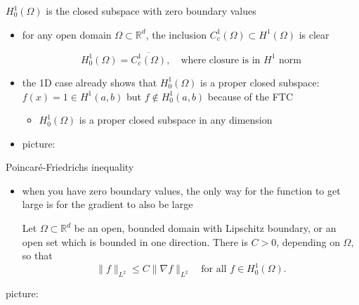 \documentclass[10pt,
               svgnames,
               hyperref={colorlinks,
                         citecolor=DeepPink4,
                         linkcolor=FireBrick,
                         urlcolor=blue},
               usepdftitle=false]{beamer}
\newcommand{\RR}{\mathbb{R}}
\newcommand{\grad}{\nabla}
\begin{document}
\begin{frame}{$H_0^1(\Omega)$ is the closed subspace with zero boundary values}

\begin{itemize}
\item for any open domain $\Omega \subset \RR^d$, the inclusion $C_c^1(\Omega) \subset H^1(\Omega)$ is clear

\begin{definition}
    $$H_0^1(\Omega) = \overline{C_c^1(\Omega)}, \quad \text{where closure is in $H^1$ norm}$$
\end{definition}

\item the 1D case already shows that $H_0^1(\Omega)$ is a proper closed subspace: $f(x)=1 \in H^1(a,b)$ but $f \notin H_0^1(a,b)$ because of the FTC
    \begin{itemize}
    \item[$\circ$] $H_0^1(\Omega)$ is a proper closed subspace in any dimension
    \end{itemize}
\item picture:

\vspace{30mm}
\end{itemize}
\end{frame}


\begin{frame}{Poincar\'e-Friedrichs inequality}

\begin{itemize}
\item when you have zero boundary values, \alert{the only way for the function to get large is for the gradient to also be large}

\begin{theorem}
Let $\Omega\subset \RR^d$ be an open, bounded domain with Lipschitz boundary, or an open set which is bounded in one direction.  There is $C>0$, depending on $\Omega$, so that
	$$\|f\|_{L^2} \le C \|\grad f\|_{L^2} \quad \text{for all } f\in H_0^1(\Omega).$$
\end{theorem}
\end{itemize}

\medskip
picture:

\vspace{30mm}
\end{frame}
\end{document}
